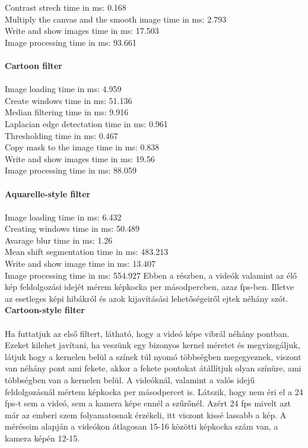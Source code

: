 Contrast strech time in ms: 0.168\\
Multiply the canvas and the smooth image time in ms: 2.793\\
Write and show images time in ms: 17.503\\
Image processing time in ms: 93.661\\\\
\textbf{Cartoon filter}\\\\
Image loading time in ms: 4.959\\
Create windows time in ms: 51.136\\
Median filtering time in ms: 9.916\\
Laplacian edge detectation time in ms: 0.961\\
Thresholding time in ms: 0.467\\
Copy mask to the image time in ms: 0.838\\
Write and show images time in ms: 19.56\\
Image processing time in ms: 88.059\\\\
\textbf{Aquarelle-style filter}\\\\
Image loading time in ms: 6.432\\
Creating windows time in ms: 50.489\\
Avarage blur time in ms: 1.26\\
Mean shift segmentation time in ms: 483.213\\
Write and show image time in ms: 13.407\\
Image processing time in ms: 554.927
Ebben a részben, a videók valamint az élő kép feldolgozási idejét mérem képkocka per másodpercben, azaz fps-ben. Illetve az esetleges képi hibákról és azok kijavításási lehetőségeiről ejtek néhány szót.
\newpage
\noindent\textbf{Cartoon-style filter}\\\\
Ha futtatjuk az első filtert, látható, hogy a videó képe vibrál néhány pontban. Ezeket kilehet javítani, ha veszünk egy bizonyos kernel méretet és megvizsgáljuk, látjuk hogy a kernelen belül a színek túl nyomó többségben megegyeznek, viszont van néhány pont ami fekete, akkor a fekete pontokat átállítjuk olyan színüre, ami többségben van a kernelen belül. A videóknál, valamint a valós idejű feldolgozásnál mértem képkocka per másodpercet is. Látszik, hogy nem éri el a 24 fps-t sem a videó, sem a kamera képe ennél a szűrőnél. Azért 24 fps mivelt azt már az emberi szem folyamatosnak érzékeli, itt viszont kissé lassabb a kép. A méréseim alapján a videókon átlagosan 15-16 közötti képkocka szám van, a kamera képén 12-15. \\\\

